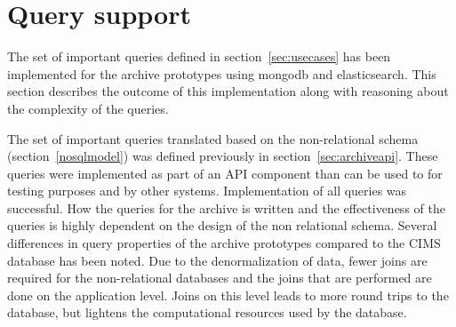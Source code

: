 
\section{Query support}

The set of important queries defined in section~\ref{sec:usecases} has been implemented for the archive prototypes using mongodb and elasticsearch. This section describes the outcome of this implementation along with reasoning about the complexity of the queries.  

The set of important queries translated based on the non-relational schema (section~\ref{nosqlmodel}) was defined previously in section~\ref{sec:archiveapi}. These queries were implemented as part of an API component than can be used to for testing purposes and by other systems. Implementation of all queries was successful. How the queries for the archive is written and the effectiveness of the queries is highly dependent on the design of the non relational schema. Several differences in query properties of the archive prototypes compared to the CIMS database has been noted. Due to the denormalization of data, fewer joins are required for the non-relational databases and the joins that are performed are done on the application level. Joins on this level leads to more round trips to the database, but lightens the computational resources used by the database.



%

